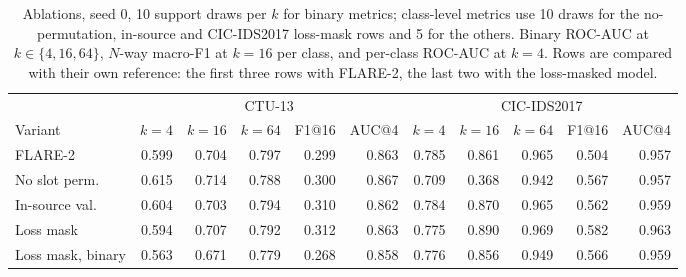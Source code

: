 \documentclass[pdflatex,sn-mathphys-num]{sn-jnl}%
\begin{document}
\begin{table}[htbp]
\centering\small
\caption{Ablations, seed 0, 10 support draws per $k$ for binary metrics; class-level metrics use 10 draws for the no-permutation, in-source and CIC-IDS2017 loss-mask rows and 5 for the others. Binary ROC-AUC at $k\in\{4,16,64\}$, $N$-way macro-F1 at $k{=}16$ per class, and per-class ROC-AUC at $k{=}4$. Rows are compared with their own reference: the first three rows with FLARE-2, the last two with the loss-masked model.}\label{tab:ablation}
{\tiny\setlength{\tabcolsep}{1.8pt}\begin{tabular}{lrrrrrrrrrr}
\toprule
 & \multicolumn{5}{c}{CTU-13} & \multicolumn{5}{c}{CIC-IDS2017} \\
Variant & $k{=}4$ & $k{=}16$ & $k{=}64$ & F1@16 & AUC@4 & $k{=}4$ & $k{=}16$ & $k{=}64$ & F1@16 & AUC@4 \\
\midrule
FLARE-2 & 0.599 & 0.704 & 0.797 & 0.299 & 0.863 & 0.785 & 0.861 & 0.965 & 0.504 & 0.957 \\
No slot perm. & 0.615 & 0.714 & 0.788 & 0.300 & 0.867 & 0.709 & 0.368 & 0.942 & 0.567 & 0.957 \\
In-source val. & 0.604 & 0.703 & 0.794 & 0.310 & 0.862 & 0.784 & 0.870 & 0.965 & 0.562 & 0.959 \\
Loss mask & 0.594 & 0.707 & 0.792 & 0.312 & 0.863 & 0.775 & 0.890 & 0.969 & 0.582 & 0.963 \\
Loss mask, binary & 0.563 & 0.671 & 0.779 & 0.268 & 0.858 & 0.776 & 0.856 & 0.949 & 0.566 & 0.959 \\
\bottomrule
\end{tabular}}
\end{table}
\end{document}
